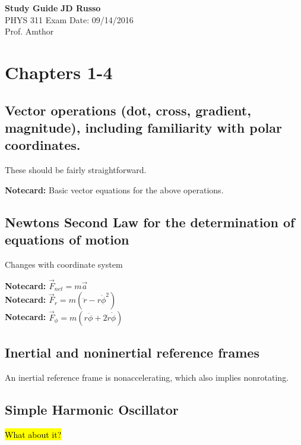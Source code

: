 \documentclass[a4paper, 11pt]{article}
\begin{document}
\noindent
\setlength\parindent{0pt}

\large\textbf{Study Guide} \hfill \textbf{JD Russo} \\
\normalsize PHYS 311  \hfill Exam Date: 09/14/2016 \\%
Prof. Amthor

\newcommand{\notecard}[1]{\textbf{Notecard:} #1\\}

\section*{Chapters 1-4}
  \subsection{Vector operations (dot, cross, gradient, magnitude), including
  familiarity with polar coordinates.}

  These should be fairly straightforward.


  \notecard{Basic vector equations for the above operations.}


  \subsection{Newtons Second Law for the determination of equations of motion}

  Changes with coordinate system

  \notecard{$ \vec{F}_{net} = m \vec{a} $}
  \notecard{$ \vec{F}_{r} = m (\ddot{r} - r \dot{\phi}^2) $}
  \notecard{$ \vec{F}_{\phi} = m ( r \ddot{\phi} + 2 \dot{r} \dot{\phi}) $}


  \subsection{Inertial and noninertial reference frames}

  An inertial reference frame is nonaccelerating, which also implies nonrotating.

  \subsection{Simple Harmonic Oscillator}

  \hl{What about it?}
\end{document}
